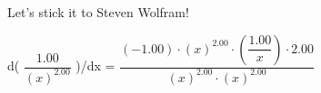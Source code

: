 \documentclass[a4paper]{article}
\begin{document}
\newpage

 Let's stick it to Steven Wolfram!

d( $
\dfrac{ 1.00 }{  \left( x \right)^{2.00 }  } $
)/dx = $
\dfrac{ (-1.00) \cdot  \left( x \right)^{2.00 }  \cdot  \left( \dfrac{ 1.00 }{ x }  \right)  \cdot 2.00 }{  \left( x \right)^{2.00 }  \cdot  \left( x \right)^{2.00 }  } $
\end{document}
